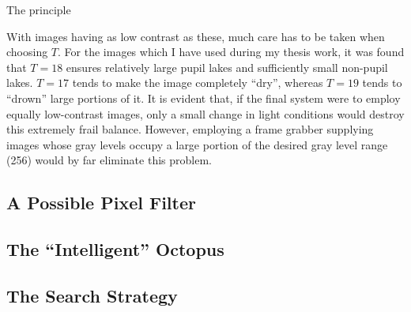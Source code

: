 The principle

With images having as low contrast as these, much care has to be taken
when choosing $T$.  For the images which I have used during my thesis
work, it was found that $T=18$ ensures relatively large pupil lakes
and sufficiently small non-pupil lakes.  $T=17$ tends to make the
image completely ``dry'', whereas $T=19$ tends to ``drown'' large
portions of it.  It is evident that, if the final system were to
employ equally low-contrast images, only a small change in light
conditions would destroy this extremely frail balance.  However,
employing a frame grabber supplying images whose gray levels occupy a
large portion of the desired gray level range (256) would by far
eliminate this problem.


\subsection{A Possible Pixel Filter}
\label{algo:seek:filter}

\subsection{The ``Intelligent'' Octopus}
\label{algo:seek:IQ}

\subsection{The Search Strategy}
\label{algo:seek:strategy}

